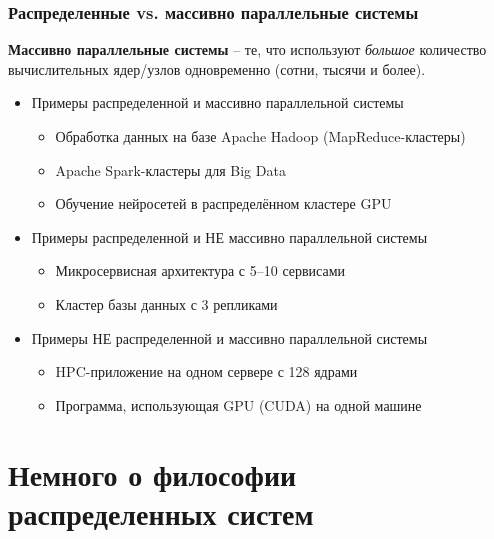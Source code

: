\documentclass{beamer}
\begin{document}
\begin{frame}
  \frametitle{Распределенные vs. массивно параллельные системы}

 {\bfseries Массивно параллельные системы} – те, что используют {\itshape большое} количество
  вычислительных ядер/узлов одновременно (сотни, тысячи и более).

 \begin{itemize}
    \item Примеры распределенной и массивно параллельной системы
    \begin{itemize}
        \item Обработка данных на базе Apache Hadoop (MapReduce-кластеры)
        \item Apache Spark-кластеры для Big Data
        \item Обучение нейросетей в распределённом кластере GPU
    \end{itemize}

    \item Примеры распределенной и НЕ массивно параллельной системы
    \begin{itemize}
        \item Микросервисная архитектура с 5–10 сервисами
        \item Кластер базы данных с 3 репликами
    \end{itemize}

    \item Примеры НЕ распределенной и массивно параллельной системы
    \begin{itemize}
        \item HPC-приложение на одном сервере с 128 ядрами
        \item Программа, использующая GPU (CUDA) на одной машине
    \end{itemize}
  \end{itemize}

\end{frame}

\section{Немного о философии распределенных систем}
\end{document}
